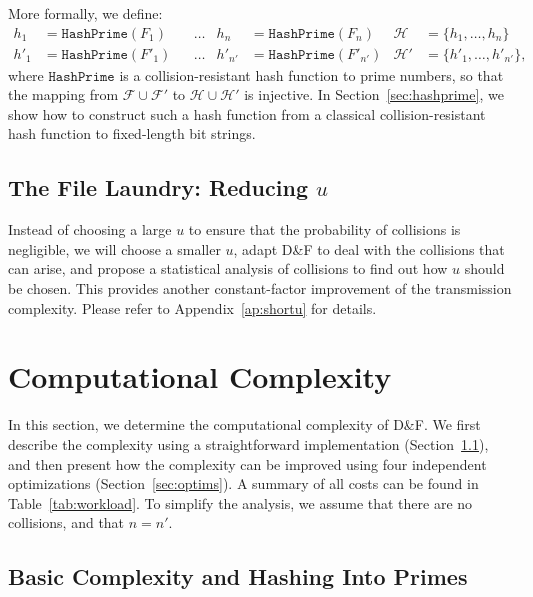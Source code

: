 \documentclass[twoside,envcountsame,runningheads]{llncs}
\newcommand{\Set}{\mathcal{H}}
\newcommand{\Files}{\mathcal{F}}
\newcommand{\df}{D\&F\xspace}
\newcommand{\HashPrime}{\ensuremath{\mathtt{HashPrime}}}
\newcommand{\apref}[1]{Appendix~\ref{#1}}
\newcommand{\apref}[1]{the full version~\cite{X:ABBMNR13}}
\begin{document}
More formally, we define:
\begin{align*}
h_1 &= \HashPrime(F_1) & &\dots & h_n &= \HashPrime(F_n) & \Set &= \{h_1,\dots,h_n\} \\
h'_1 &= \HashPrime(F'_1) & &\dots & h'_{n'} &= \HashPrime(F'_{n'}) & \Set' &= \{h'_1,\dots,h'_{n'}\},
\end{align*}
where $\HashPrime$ is a collision-resistant hash function to prime numbers, so that the mapping from $\Files \cup \Files'$ to $\Set \cup \Set'$ is injective.
In Section~\ref{sec:hashprime}, we show how to construct such a hash function from a classical collision-resistant hash function to fixed-length bit strings.

\subsection{The File Laundry: Reducing $u$}
\label{sec:shortu}

Instead of choosing a large $u$ to ensure that the probability of collisions is negligible, we will choose a smaller $u$, adapt \df to deal with the collisions that can arise, and propose a statistical analysis of collisions to find out how $u$ should be chosen.
This provides another constant-factor improvement of the transmission complexity. Please refer to \apref{ap:shortu} for details.

\section{Computational Complexity}
\label{sec:comp}
In this section, we determine the computational complexity of \df. We first describe the complexity using a straightforward implementation (Section~\ref{sec:basiccomp}), and then present how the complexity can be improved using four independent optimizations (Section~\ref{sec:optims}). A summary of all costs can be found in Table~\ref{tab:workload}.
To simplify the analysis, we assume that there are no collisions, and that $n=n'$.


\subsection{Basic Complexity and Hashing Into Primes}
\label{sec:basiccomp}
\label{sec:hashprime}
\end{document}
